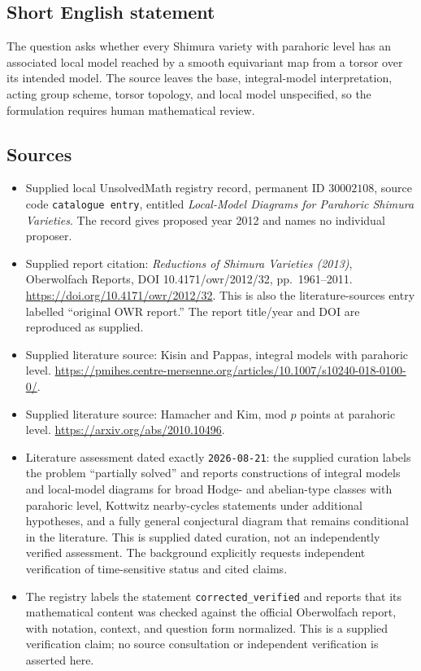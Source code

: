 \documentclass[11pt]{article}
\begin{document}
\subsection{Short English statement}
The question asks whether every Shimura variety with parahoric level has an associated local model reached by a smooth equivariant map from a torsor over its intended model. The source leaves the base, integral-model interpretation, acting group scheme, torsor topology, and local model unspecified, so the formulation requires human mathematical review.
\subsection{Sources}
\begin{itemize}
\item Supplied local UnsolvedMath registry record, permanent ID \(30002108\), source code \texttt{catalogue entry}, entitled \emph{Local-Model Diagrams for Parahoric Shimura Varieties}. The record gives proposed year 2012 and names no individual proposer.
\item Supplied report citation: \emph{Reductions of Shimura Varieties (2013)}, Oberwolfach Reports, DOI 10.4171/owr/2012/32, pp.\ 1961--2011. \url{https://doi.org/10.4171/owr/2012/32}. This is also the literature-sources entry labelled ``original OWR report.'' The report title/year and DOI are reproduced as supplied.
\item Supplied literature source: Kisin and Pappas, integral models with parahoric level. \url{https://pmihes.centre-mersenne.org/articles/10.1007/s10240-018-0100-0/}.
\item Supplied literature source: Hamacher and Kim, mod \(p\) points at parahoric level. \url{https://arxiv.org/abs/2010.10496}.
\item Literature assessment dated exactly \texttt{2026-08-21}: the supplied curation labels the problem ``partially solved'' and reports constructions of integral models and local-model diagrams for broad Hodge- and abelian-type classes with parahoric level, Kottwitz nearby-cycles statements under additional hypotheses, and a fully general conjectural diagram that remains conditional in the literature. This is supplied dated curation, not an independently verified assessment. The background explicitly requests independent verification of time-sensitive status and cited claims.
\item The registry labels the statement \texttt{corrected\_verified} and reports that its mathematical content was checked against the official Oberwolfach report, with notation, context, and question form normalized. This is a supplied verification claim; no source consultation or independent verification is asserted here.
\end{itemize}
\end{document}
